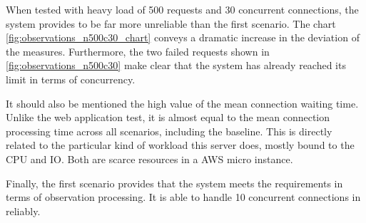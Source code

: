 When tested with heavy load of 500 requests and 30 concurrent connections, the system provides to be far more unreliable than the first scenario. The chart \ref{fig:observations_n500c30_chart} conveys a dramatic increase in the deviation of the measures. Furthermore, the two failed requests shown in \ref{fig:observations_n500c30} make clear that the system has already reached its limit in terms of concurrency.

It should also be mentioned the high value of the mean connection waiting time. Unlike the web application test, it is almost equal to the mean connection processing time across all scenarios, including the baseline. This is directly related to the particular kind of workload this server does,  mostly bound to the CPU and IO. Both are scarce resources in a AWS micro instance.

Finally, the first scenario provides that the system meets the requirements in terms of observation processing. It is able to handle 10 concurrent connections in reliably.


